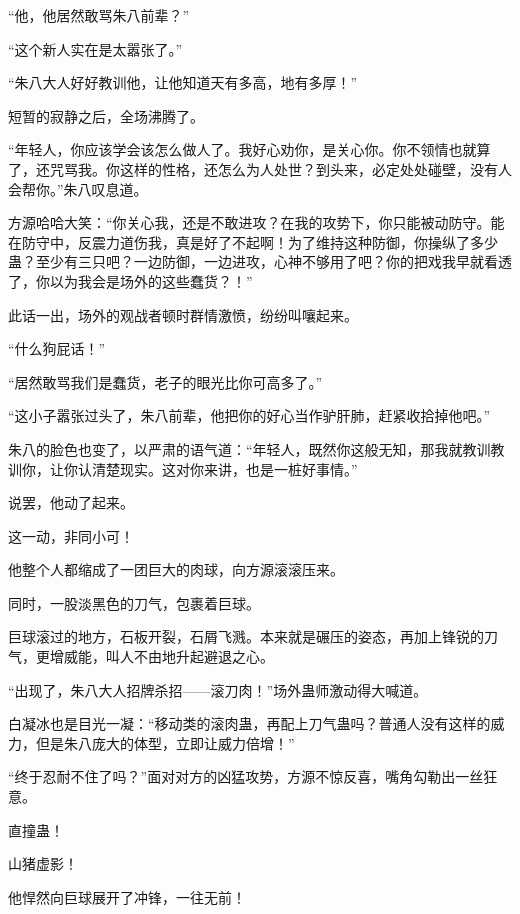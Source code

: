 
\begin{this_body}



“他，他居然敢骂朱八前辈？”

“这个新人实在是太嚣张了。”

“朱八大人好好教训他，让他知道天有多高，地有多厚！”

短暂的寂静之后，全场沸腾了。

“年轻人，你应该学会该怎么做人了。我好心劝你，是关心你。你不领情也就算了，还咒骂我。你这样的性格，还怎么为人处世？到头来，必定处处碰壁，没有人会帮你。”朱八叹息道。

方源哈哈大笑：“你关心我，还是不敢进攻？在我的攻势下，你只能被动防守。能在防守中，反震力道伤我，真是好了不起啊！为了维持这种防御，你操纵了多少蛊？至少有三只吧？一边防御，一边进攻，心神不够用了吧？你的把戏我早就看透了，你以为我会是场外的这些蠢货？！”

此话一出，场外的观战者顿时群情激愤，纷纷叫嚷起来。

“什么狗屁话！”

“居然敢骂我们是蠢货，老子的眼光比你可高多了。”

“这小子嚣张过头了，朱八前辈，他把你的好心当作驴肝肺，赶紧收拾掉他吧。”

朱八的脸色也变了，以严肃的语气道：“年轻人，既然你这般无知，那我就教训教训你，让你认清楚现实。这对你来讲，也是一桩好事情。”

说罢，他动了起来。

这一动，非同小可！

他整个人都缩成了一团巨大的肉球，向方源滚滚压来。

同时，一股淡黑色的刀气，包裹着巨球。

巨球滚过的地方，石板开裂，石屑飞溅。本来就是碾压的姿态，再加上锋锐的刀气，更增威能，叫人不由地升起避退之心。

“出现了，朱八大人招牌杀招——滚刀肉！”场外蛊师激动得大喊道。

白凝冰也是目光一凝：“移动类的滚肉蛊，再配上刀气蛊吗？普通人没有这样的威力，但是朱八庞大的体型，立即让威力倍增！”

“终于忍耐不住了吗？”面对对方的凶猛攻势，方源不惊反喜，嘴角勾勒出一丝狂意。

直撞蛊！

山猪虚影！

他悍然向巨球展开了冲锋，一往无前！


\end{this_body}
